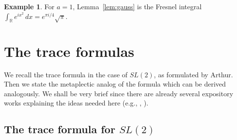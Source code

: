 \documentclass[12pt,letterpaper]{book}
\theoremstyle{plain}
\theoremstyle{definition}
\newtheorem{example}[theorem]{Example}
\theoremstyle{remark}
\theoremstyle{remark}
\begin{document}














\begin{example}
For $a=1$, Lemma~\ref{lem:gauss} is the Fresnel integral
$\int_{\mathbb R}e^{ix^2}\,dx=e^{\pi i/4}\sqrt{\pi}$.
\end{example}

\chapter{The trace formulas}\label{ch:tf}

We recall the trace formula in the case of $SL(2)$, as formulated by
Arthur. Then we state the metaplectic analog of the formula which
can be derived analogously. We shall be very brief since there are
already several expository works explaining the ideas needed here
(e.g., \cite{A15}, \cite{MW}).

\section{The trace formula for \texorpdfstring{$SL(2)$}{SL(2)}}
\end{document}
